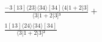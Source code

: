 \documentclass[varwidth, border=5pt]{standalone}
\begin{document}
\begin{my}
$\begin{gathered}
\scriptscriptstyle\frac{-3[13]⟨23⟩⟨34⟩[34]⟨4|1+2|3]}{⟨3|1+2|3]³} +\\
\scriptscriptstyle\frac{1[13]⟨24⟩⟨34⟩[34]}{⟨3|1+2|3]²} \phantom{+}
\end{gathered}$
\end{my}
\end{document}
